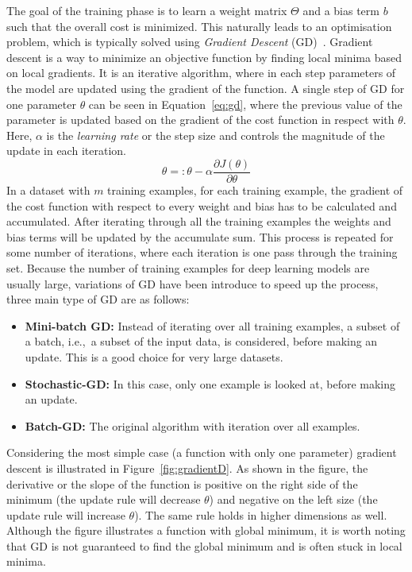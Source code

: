 The goal of the training phase is to learn a weight matrix $\Theta$ and a bias term $b$ such that the overall cost is minimized. This naturally leads to an optimisation problem, which is  typically solved using \emph{Gradient Descent} (GD)~.
Gradient descent is a way to minimize an objective function by finding local minima based on local gradients.
It is an iterative algorithm, where in each step parameters of the model are updated using the gradient of the function. A single step of GD  for one parameter $\theta$ can be seen in Equation~\ref{eq:gd}, where the previous value of the parameter is updated based on the gradient of the cost function in respect with $\theta$. Here, $\alpha$ is the \emph{learning rate} or the step size and controls the magnitude of the update in each iteration. 
\begin{equation}
\theta=: \theta- \alpha\frac { \partial J(\theta) }{ \partial \theta }
\label{eq:gd}
\end{equation}
In a dataset with $m$ training examples, for each training example, the gradient of the cost function with respect to every weight and bias has to be calculated and accumulated.
After iterating through all the training examples the weights and bias terms will be updated by the accumulate sum. This process is repeated for some number of iterations, where each iteration is one pass through the training set. Because the number of training examples for deep learning models are usually large, variations of GD have been introduce to speed up the process, three main type of GD are as follows: 
\begin{itemize}
\item \textbf{Mini-batch GD:} Instead of iterating over all training examples, a subset of a batch, i.e.,\ a subset of the input data, is considered, before making an update. This is a good choice for very large datasets.
\item \textbf{Stochastic-GD:} In this case, only one example is looked at, before making an update. 
\item \textbf{Batch-GD:} The original algorithm with iteration over all examples. 
\end{itemize} 
Considering the most simple case (a function with only one parameter) gradient descent is illustrated in Figure~\ref{fig:gradientD}. As shown in the figure, the derivative or the slope of the function is positive on the right side of the minimum (the update rule will decrease $\theta$) and negative on the left size (the update rule will increase $\theta$). The same rule holds in higher dimensions as well. Although the figure illustrates a function with global minimum, it is worth noting that GD is not guaranteed to find the global minimum and is often stuck in local minima.\\
